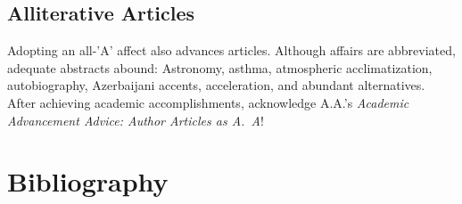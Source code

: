 \documentclass[twocolumn]{article}
\begin{document}
\subsection{Alliterative Articles}

Adopting an all-'A' affect also advances articles. Although affairs
are abbreviated, adequate abstracts abound: Astronomy, asthma,
atmospheric acclimatization, autobiography, Azerbaijani accents,
acceleration, and abundant alternatives. After achieving academic
accomplishments, acknowledge A.A.'s {\it Academic Advancement Advice:
  Author Articles as A.~A}!

\section{Bibliography}



\end{document}
